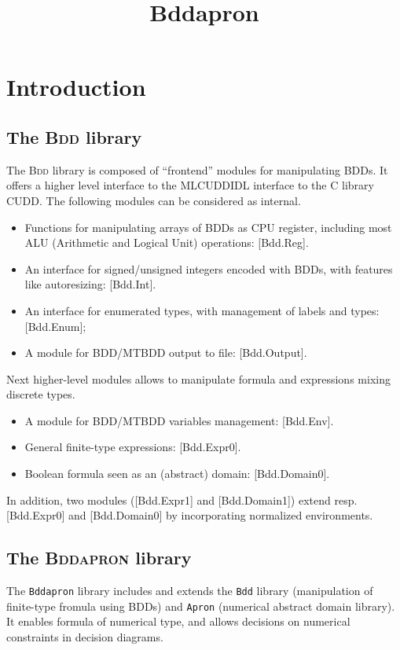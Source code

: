 \documentclass[twoside,10pt,a4paper]{report}
\title{Bddapron}
\begin{document}
\maketitle

\tableofcontents

\chapter{Introduction}

\section{The \textsc{Bdd} library}

The \textsc{Bdd} library is composed of ``frontend'' modules for
manipulating BDDs. It offers a higher level interface to the
MLCUDDIDL interface to the C library CUDD. The following modules
can be considered as internal.
\begin{itemize}
\item Functions for manipulating arrays of BDDs as CPU register,
  including most ALU (Arithmetic and Logical Unit) operations:
  [Bdd.Reg].
\item An interface for signed/unsigned integers encoded with BDDs,
  with features like autoresizing: [Bdd.Int].
\item An interface for enumerated types, with management of labels
  and types: [Bdd.Enum];
\item A module for BDD/MTBDD output to file: [Bdd.Output].
\end{itemize}

Next higher-level modules allows to manipulate formula and
expressions mixing discrete types.
\begin{itemize}
\item A module for BDD/MTBDD variables management: [Bdd.Env].
\item General finite-type expressions: [Bdd.Expr0].
\item Boolean formula seen as an (abstract) domain: [Bdd.Domain0].
\end{itemize}
In addition, two modules ([Bdd.Expr1] and [Bdd.Domain1]) extend
resp. [Bdd.Expr0] and [Bdd.Domain0] by incorporating normalized
environments.

\section{The \textsc{Bddapron} library}

The \texttt{Bddapron} library includes and extends the
\texttt{Bdd} library (manipulation of finite-type fromula using
BDDs) and \texttt{Apron} (numerical abstract domain library). It
enables formula of numerical type, and allows decisions on
numerical constraints in decision diagrams.
\end{document}
